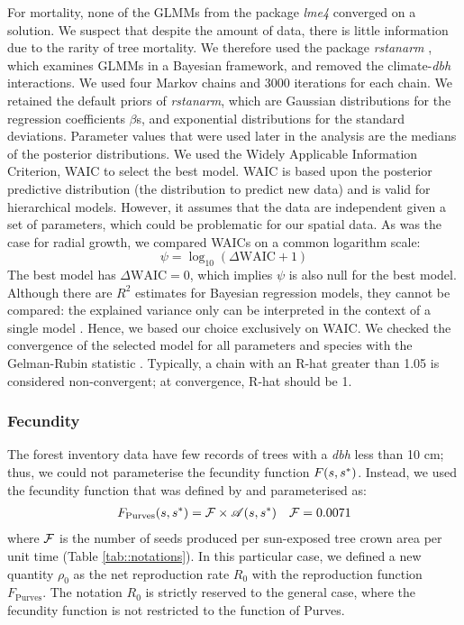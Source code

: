 For mortality, none of the GLMMs from the package \textit{lme4} converged on a solution. We suspect that despite the amount of data, there is little information due to the rarity of tree mortality. We therefore used the package \textit{rstanarm} \citep{rstanarm}, which examines GLMMs in a Bayesian framework, and removed the climate-\textit{dbh} interactions. We used four Markov chains and 3000 iterations for each chain. We retained the default priors of \textit{rstanarm}, which are Gaussian distributions for the regression coefficients $ \beta $s, and exponential distributions for the standard deviations. Parameter values that were used later in the analysis are the medians of the posterior distributions. We used the Widely Applicable Information Criterion, \ie WAIC \citep[and references therein]{Hooten2015} to select the best model. WAIC is based upon the posterior predictive distribution (the distribution to predict new data) and is valid for hierarchical models. However, it assumes that the data are independent given a set of parameters, which could be problematic for our spatial data. As was the case for radial growth, we compared WAICs on a common logarithm scale:
\begin{equation} \label{eq::psi}
	\psi = \log_{10}(\Delta \text{WAIC} + 1)
\end{equation}
The best model has $ \Delta \text{WAIC} = 0 $, which implies $ \psi $ is also null for the best model. Although there are $ R^2 $ estimates for Bayesian regression models, they cannot be compared: the explained variance only can be interpreted in the context of a single model \citep{Gelman2018}. Hence, we based our choice exclusively on WAIC. We checked the convergence of the selected model for all parameters and species with the Gelman-Rubin statistic \citep[R-hat diagnostic]{Gelman1992}. Typically, a chain with an R-hat greater than 1.05 is considered non-convergent; at convergence, R-hat should be 1.

\subsubsection{Fecundity}
The forest inventory data have few records of trees with a \textit{dbh} less than 10 cm; thus, we could not parameterise the fecundity function $ F(s, {s}^{*}) $. Instead, we used the fecundity function that was defined by \citet{Purves2008} and parameterised as:
\begin{align} \label{eq::fecundity_fct}
	F_{\text{Purves}}(s, {s}^{*}) = \mathcal{F} \times \mathscr{A}(s, {s}^{*}) && \mathcal{F} = 0.0071
\end{align}
where $ \mathcal{F} $ is the number of seeds produced per sun-exposed tree crown area per unit time (Table \ref{tab::notations}). In this particular case, we defined a new quantity $ \rho_0 $ as the net reproduction rate $ R_0 $ with the reproduction function $ F_{\text{Purves}} $. The notation $ R_0 $ is strictly reserved to the general case, where the fecundity function is not restricted to the function of Purves.

